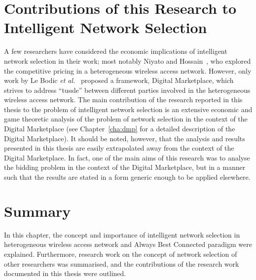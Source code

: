 \section{Contributions of this Research to Intelligent Network Selection} %
\label{sec:contributions_of_this_research_to_intelligent_network_selection_intelligent}
A few researchers have considered the economic implications of intelligent network selection in their work; most notably Niyato and Hossain~\cite{NiyatoHossain2008}, who explored the competitive pricing in a heterogeneous wireless access network. However, only work by Le Bodic \emph{et al.}~\cite{DMLeBodic00} proposed a framework, Digital Marketplace, which strives to address ``tussle'' between different parties involved in the heterogeneous wireless access network. The main contribution of the research reported in this thesis to the problem of intelligent network selection is an extensive economic and game theoretic analysis of the problem of network selection in the context of the Digital Marketplace (see Chapter~\ref{cha:dmp} for a detailed description of the Digital Marketplace). It should be noted, however, that the analysis and results presented in this thesis are easily extrapolated away from the context of the Digital Marketplace. In fact, one of the main aims of this research was to analyse the bidding problem in the context of the Digital Marketplace, but in a manner such that the results are stated in a form generic enough to be applied elsewhere.

\section{Summary} %
\label{sec:summary_intelligent}
In this chapter, the concept and importance of intelligent network selection in heterogeneous wireless access network and Always Best Connected paradigm were explained. Furthermore, research work on the concept of network selection of other researchers was summarised, and the contributions of the research work documented in this thesis were outlined.
